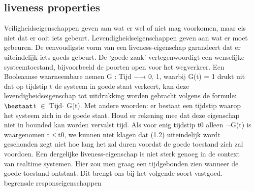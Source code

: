 \documentclass{article}
\begin{document}
	\subsection{liveness properties}
	Veiligheidseigenschappen geven aan wat er wel of niet mag voorkomen,
	maar eis niet dat er ooit iets gebeurt. Levendigheidseigenschappen geven aan wat er moet gebeuren. De eenvoudigste vorm van een liveness-eigenschap garandeert dat er uiteindelijk iets goeds gebeurt. De
	‘goede zaak’ vertegenwoordigt een wenselijke systeemtoestand, bijvoorbeeld de
	poorten open voor het wegverkeer. Een Booleaanse waarneembare nemen
	G : Tijd −→ {0, 1}, waarbij G(t) = 1 drukt uit dat op tijdstip t de
	systeem in goede staat verkeert, kan deze levendigheidseigenschap tot uitdrukking worden gebracht
	volgens de formule:
	$\bestaat$t $\in$ Tijd $\dot{}$ G(t).
	Met andere woorden: er bestaat een tijdstip waarop het systeem zich in de
	goede staat. Houd er rekening mee dat deze eigenschap niet in bounded kan worden vervalst
	tijd. Als voor enig tijdstip t0 alleen ¬G(t) is waargenomen
	t ≤ t0, we kunnen niet klagen dat (1.2) uiteindelijk wordt geschonden
	zegt niet hoe lang het zal duren voordat de goede toestand zich zal voordoen.
	Een dergelijke liveness-eigenschap is niet sterk genoeg in de context van realtime systemen. Hier zou men graag een tijdgebonden zien wanneer de
	goede toestand ontstaat. Dit brengt ons bij het volgende soort vastgoed.
	begrensde responseigenschappen
	
	
	
	
	
	
	
 
	
	
	
	
	
\end{document}
